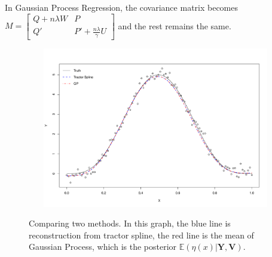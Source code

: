 In Gaussian Process Regression, the covariance matrix becomes
$M=\begin{bmatrix}
Q+n\lambda W& P\\
Q'& P'+\frac{n\lambda}{\gamma}U
\end{bmatrix}$ and the rest remains the same.

\begin{figure}[h]
	\centering
	\includegraphics[width=12cm,height=7cm]{Chapters/03GPR/plot/sim_cov} \\
 \caption{Comparing two methods. In this graph, the blue line is reconstruction from tractor spline, the red line is the mean of Gaussian Process, which is the posterior $\mathbb{E}(\eta(x) | \mathbf{Y}, \mathbf{V})$.}
\end{figure}


